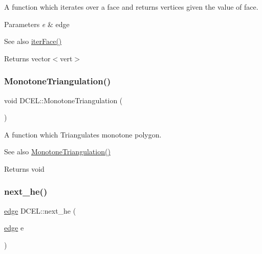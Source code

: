 A function which iterates over a face and returns vertices given the value of face. 


\begin{DoxyParams}{Parameters}
{\em e} & edge \\
\hline
\end{DoxyParams}
\begin{DoxySeeAlso}{See also}
\hyperlink{class_d_c_e_l_a746b067777dfc25859a7082f27a1364e}{iter\+Face()} 
\end{DoxySeeAlso}
\begin{DoxyReturn}{Returns}
vector$<$vert$>$ 
\end{DoxyReturn}
\mbox{\label{class_d_c_e_l_a989e872e63f1d245aca75ffae6d5c608}} 
\subsubsection{\texorpdfstring{Monotone\+Triangulation()}{MonotoneTriangulation()}}
{\footnotesize\ttfamily void D\+C\+E\+L\+::\+Monotone\+Triangulation (\begin{DoxyParamCaption}{ }\end{DoxyParamCaption})\hspace{0.3cm}{\ttfamily [inline]}}



A function which Triangulates monotone polygon. 

\begin{DoxySeeAlso}{See also}
\hyperlink{class_d_c_e_l_a989e872e63f1d245aca75ffae6d5c608}{Monotone\+Triangulation()} 
\end{DoxySeeAlso}
\begin{DoxyReturn}{Returns}
void 
\end{DoxyReturn}
\mbox{\label{class_d_c_e_l_a384c90222cc7e6a09ba47d66e9e11df8}} 
\subsubsection{\texorpdfstring{next\+\_\+he()}{next\_he()}}
{\footnotesize\ttfamily \hyperlink{_polygon_triangulation_8h_a4ef43ff5c6d42dacbc8ffd9c8cfdc189}{edge} D\+C\+E\+L\+::next\+\_\+he (\begin{DoxyParamCaption}\item[{\hyperlink{_polygon_triangulation_8h_a4ef43ff5c6d42dacbc8ffd9c8cfdc189}{edge}}]{e }\end{DoxyParamCaption})\hspace{0.3cm}{\ttfamily [inline]}}




